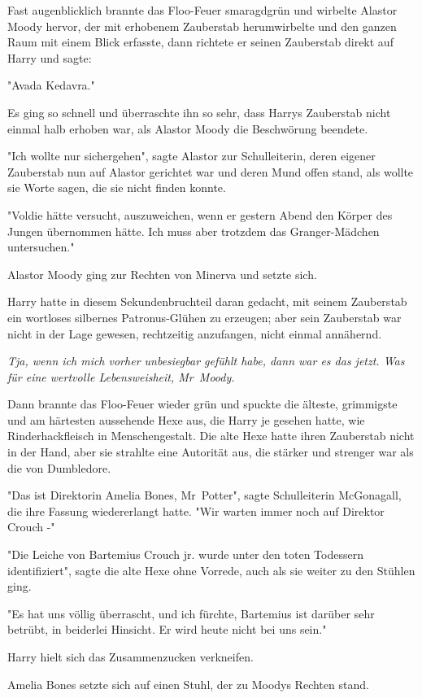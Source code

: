 {Fast augenblicklich brannte das Floo-Feuer smaragdgrün und wirbelte Alastor Moody hervor, der mit erhobenem Zauberstab herumwirbelte und den ganzen Raum mit einem Blick erfasste, dann richtete er seinen Zauberstab direkt auf Harry und sagte:

"Avada Kedavra."

Es ging so schnell und überraschte ihn so sehr, dass Harrys Zauberstab nicht einmal halb erhoben war, als Alastor Moody die Beschwörung beendete.

"Ich wollte nur sichergehen", sagte Alastor zur Schulleiterin, deren eigener Zauberstab nun auf Alastor gerichtet war und deren Mund offen stand, als wollte sie Worte sagen, die sie nicht finden konnte.

"Voldie hätte versucht, auszuweichen, wenn er gestern Abend den Körper des Jungen übernommen hätte. Ich muss aber trotzdem das Granger-Mädchen untersuchen."

Alastor Moody ging zur Rechten von Minerva und setzte sich.

Harry hatte in diesem Sekundenbruchteil daran gedacht, mit seinem Zauberstab ein wortloses silbernes Patronus-Glühen zu erzeugen; aber sein Zauberstab war nicht in der Lage gewesen, rechtzeitig anzufangen, nicht einmal annähernd.

\emph{Tja, wenn ich mich vorher unbesiegbar gefühlt habe, dann war es das jetzt. Was für eine wertvolle Lebensweisheit, Mr~Moody.}

Dann brannte das Floo-Feuer wieder grün und spuckte die älteste, grimmigste und am härtesten aussehende Hexe aus, die Harry je gesehen hatte, wie Rinderhackfleisch in Menschengestalt. Die alte Hexe hatte ihren Zauberstab nicht in der Hand, aber sie strahlte eine Autorität aus, die stärker und strenger war als die von Dumbledore.

"Das ist Direktorin Amelia Bones, Mr~Potter", sagte Schulleiterin McGonagall, die ihre Fassung wiedererlangt hatte. "Wir warten immer noch auf Direktor Crouch -"

"Die Leiche von Bartemius Crouch jr. wurde unter den toten Todessern identifiziert", sagte die alte Hexe ohne Vorrede, auch als sie weiter zu den Stühlen ging.

"Es hat uns völlig überrascht, und ich fürchte, Bartemius ist darüber sehr betrübt, in beiderlei Hinsicht. Er wird heute nicht bei uns sein."

Harry hielt sich das Zusammenzucken verkneifen.

Amelia Bones setzte sich auf einen Stuhl, der zu Moodys Rechten stand.

}
